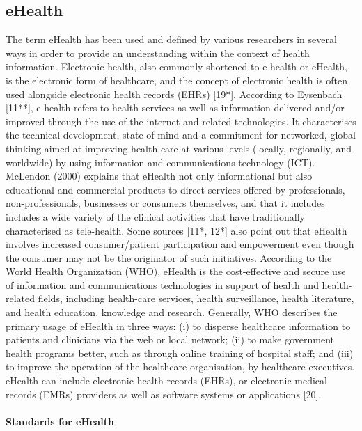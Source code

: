 \documentclass[a4paper]{article}
\begin{document}
\subsection{eHealth}
The term eHealth has been used and defined by various researchers in several ways in order to provide an understanding within the context of health information. Electronic health, also commonly shortened to e-health or eHealth, is the electronic form of healthcare, and the concept of electronic health is often used alongside electronic health records (EHRs) [19*]. According to Eysenbach [11**], e-health refers to health services as well as information delivered and/or improved through the use of the internet and related technologies. It characterises the technical development, state-of-mind and a commitment for networked, global thinking aimed at improving health care at various levels (locally, regionally, and worldwide) by using information and communications technology (ICT). McLendon (2000) explains that eHealth not only informational but also educational and commercial products to direct services offered by professionals, non-professionals, businesses or consumers themselves, and that it includes includes a wide variety of the clinical activities that have traditionally characterised as tele-health. Some sources [11*, 12*] also point out that eHealth involves increased consumer/patient participation and empowerment even though the consumer may not be the originator of such initiatives. According to the World Health Organization (WHO), eHealth is the cost-effective and secure use of information and communications technologies in support of health and health-related fields, including health-care services,
health surveillance, health literature, and health education, knowledge and research. Generally, WHO describes the primary usage of eHealth in three ways: (i) to disperse healthcare information to patients and clinicians via the web or local network; (ii) to make government health programs better, such as through online training of hospital staff; and (iii) to improve the operation of the healthcare organisation, by healthcare executives. eHealth can include electronic health records (EHRs), or electronic medical records (EMRs) providers as well as software systems or applications [20].\\ \\
{\bf Standards for eHealth}\\
\end{document}
